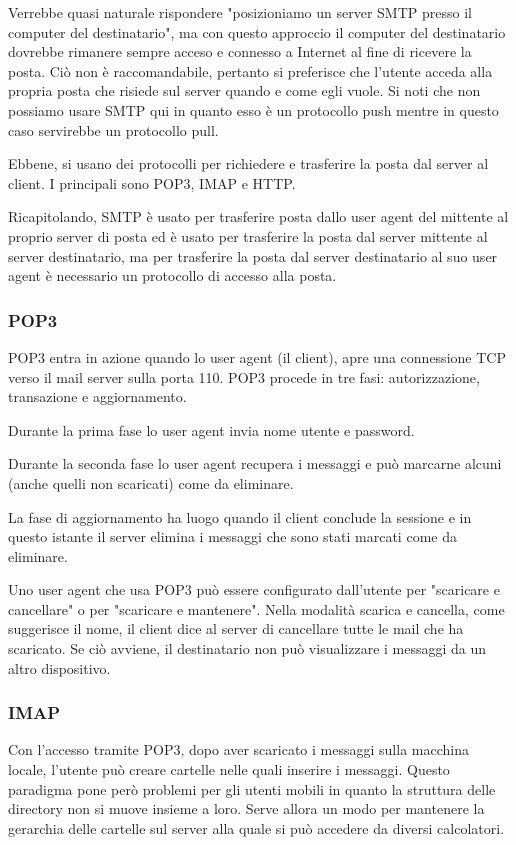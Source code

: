 \documentclass{book}
\begin{document}
Verrebbe quasi naturale rispondere "posizioniamo un server SMTP presso il computer del destinatario", ma con questo approccio il computer del destinatario dovrebbe rimanere sempre acceso e connesso a Internet al fine di ricevere la posta. Ciò non è raccomandabile, pertanto si preferisce che l'utente acceda alla propria posta che risiede sul server quando e come egli vuole. Si noti che non possiamo usare SMTP qui in quanto esso è un protocollo push mentre in questo caso servirebbe un protocollo pull.

Ebbene, si usano dei protocolli per richiedere e trasferire la posta dal server al client. I principali sono POP3, IMAP e HTTP.

Ricapitolando, SMTP è usato per trasferire posta dallo user agent del mittente al proprio server di posta ed è usato per trasferire la posta dal server mittente al server destinatario, ma per trasferire la posta dal server destinatario al suo user agent è necessario un protocollo di accesso alla posta.

\subsubsection*{POP3}
POP3 entra in azione quando lo user agent (il client), apre una connessione TCP verso il mail server sulla porta 110. POP3 procede in tre fasi: autorizzazione, transazione e aggiornamento.

Durante la prima fase lo user agent invia nome utente e password.

Durante la seconda fase lo user agent recupera i messaggi e può marcarne alcuni (anche quelli non scaricati) come da eliminare.

La fase di aggiornamento ha luogo quando il client conclude la sessione e in questo istante il server elimina i messaggi che sono stati marcati come da eliminare.

Uno user agent che usa POP3 può essere configurato dall'utente per "scaricare e cancellare" o per "scaricare e mantenere". Nella modalità scarica e cancella, come suggerisce il nome, il client dice al server di cancellare tutte le mail che ha scaricato. Se ciò avviene, il destinatario non può visualizzare i messaggi da un altro dispositivo.

\subsubsection*{IMAP}
Con l'accesso tramite POP3, dopo aver scaricato i messaggi sulla macchina locale, l'utente può creare cartelle nelle quali inserire i messaggi. Questo paradigma pone però problemi per gli utenti mobili in quanto la struttura delle directory non si muove insieme a loro. Serve allora un modo per mantenere la gerarchia delle cartelle sul server alla quale si può accedere da diversi calcolatori.
\end{document}

